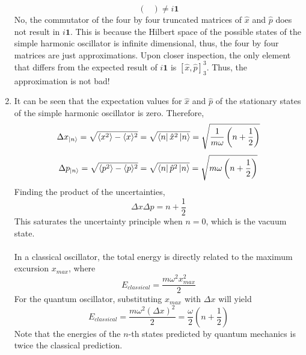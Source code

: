 \begin{sol}
\begin{enumerate}[label=\textbf{(\alph*)}]
$$\begin{pmatrix}
\end{pmatrix}\neq i\mathbf 1$$ 
No, the commutator of the four by four truncated matrices of $\hat x$ and $\hat p$ does not result in $i\mathbf 1$. This is because the Hilbert space of the possible states of the simple harmonic oscillator is infinite dimensional, thus, the four by four matrices are just approximations. Upon closer inspection, the only element that differs from the expected result of $i\mathbf{1}$ is $[\hat x,\hat p]_3^3$. Thus, the approximation is not bad!
\item
It can be seen that the expectation values for $\hat x$ and $\hat p$ of the stationary states of the simple harmonic oscillator is zero. Therefore,
$$\Delta x_{\ket n}=\sqrt{\langle x^2\rangle-\langle x\rangle^2}=\sqrt{\bra n\hat x^2\ket n}=\sqrt{\frac{1}{m\omega}\left(n+\frac{1}{2}\right) }$$
$$\Delta p_{\ket n}=\sqrt{\langle p^2\rangle-\langle p\rangle^2}=\sqrt{\bra n\hat p^2\ket n}=\sqrt{m\omega\left(n+\frac{1}{2}\right)} $$
Finding the product of the uncertainties,
$$\Delta x\Delta p=n+\frac{1}{2}$$ 
This saturates the uncertainty principle when $n=0$, which is the vacuum state.\\\\
In a classical oscillator, the total energy is directly related to the maximum excursion $x_{max}$, where 
$$E_{classical}=\frac{m\omega^2x_{max}^2}{2}$$ 
For the quantum oscillator, substituting $x_{max}$ with $\Delta x$ will yield
$$E_{classical}=\frac{m\omega^2(\Delta x)^2}{2}=\frac{\omega}{2}\left(n+\frac{1}{2}\right)$$
Note that the energies of the $n$-th states predicted by quantum mechanics is twice the classical prediction. 
\end{enumerate}
\end{sol}